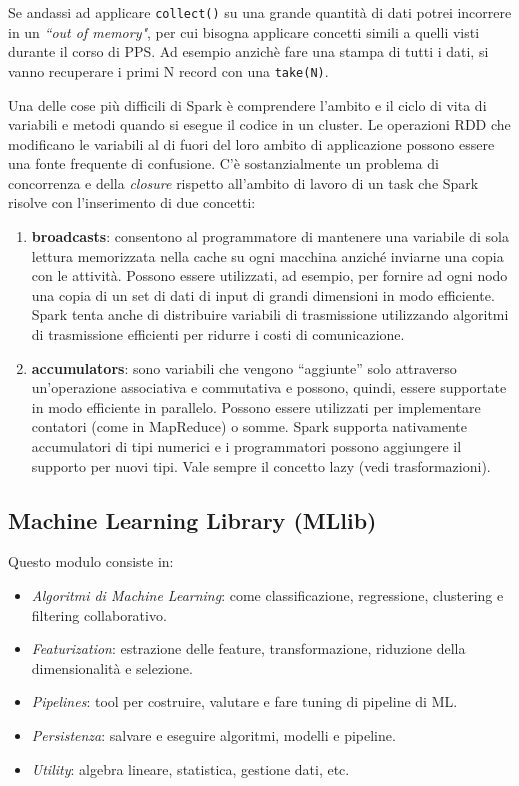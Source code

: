 \documentclass[12pt,italian]{article}
\begin{document}
\par Se andassi ad applicare \texttt{collect()} su una grande quantità di dati potrei incorrere in un \textit{``out of memory"}, per cui bisogna applicare concetti simili a quelli visti durante il corso di PPS. Ad esempio anzichè fare una stampa di tutti i dati, si vanno recuperare i primi N record con una \texttt{take(N)}.
\par Una delle cose più difficili di Spark è comprendere l'ambito e il ciclo di vita di variabili e metodi quando si esegue il codice in un cluster. Le operazioni RDD che modificano le variabili al di fuori del loro ambito di applicazione possono essere una fonte frequente di confusione. C'è sostanzialmente un problema di concorrenza e della \textit{closure} rispetto all'ambito di lavoro di un task che Spark risolve con l'inserimento di due concetti:
\begin{enumerate}
	\item \textbf{broadcasts}\label{sec:broadcasts}:  consentono al programmatore di mantenere una variabile di sola lettura memorizzata nella cache su ogni macchina anziché inviarne una copia con le attività. Possono essere utilizzati, ad esempio, per fornire ad ogni nodo una copia di un set di dati di input di grandi dimensioni in modo efficiente. Spark tenta anche di distribuire variabili di trasmissione utilizzando algoritmi di trasmissione efficienti per ridurre i costi di comunicazione.
	\item \textbf{accumulators}\label{sec:aoccumulators}: sono variabili che vengono “aggiunte” solo attraverso un'operazione associativa e commutativa e possono, quindi, essere supportate in modo efficiente in parallelo. Possono essere utilizzati per implementare contatori (come in MapReduce) o somme. Spark supporta nativamente accumulatori di tipi numerici e i programmatori possono aggiungere il supporto per nuovi tipi. Vale sempre il concetto lazy (vedi trasformazioni).
\end{enumerate}
\subsection{Machine Learning Library (MLlib)}
Questo modulo consiste in:
\begin{itemize}
	\item \textit{Algoritmi di Machine Learning}: come classificazione, regressione, clustering e filtering collaborativo.
	\item \textit{Featurization}: estrazione delle feature, transformazione, riduzione della dimensionalità e selezione.
	\item \textit{Pipelines}: tool per costruire, valutare e fare tuning di pipeline di ML.
	\item \textit{Persistenza}: salvare e eseguire algoritmi, modelli e pipeline.
	\item \textit{Utility}: algebra lineare, statistica, gestione dati, etc.
\end{itemize}
\end{document}
